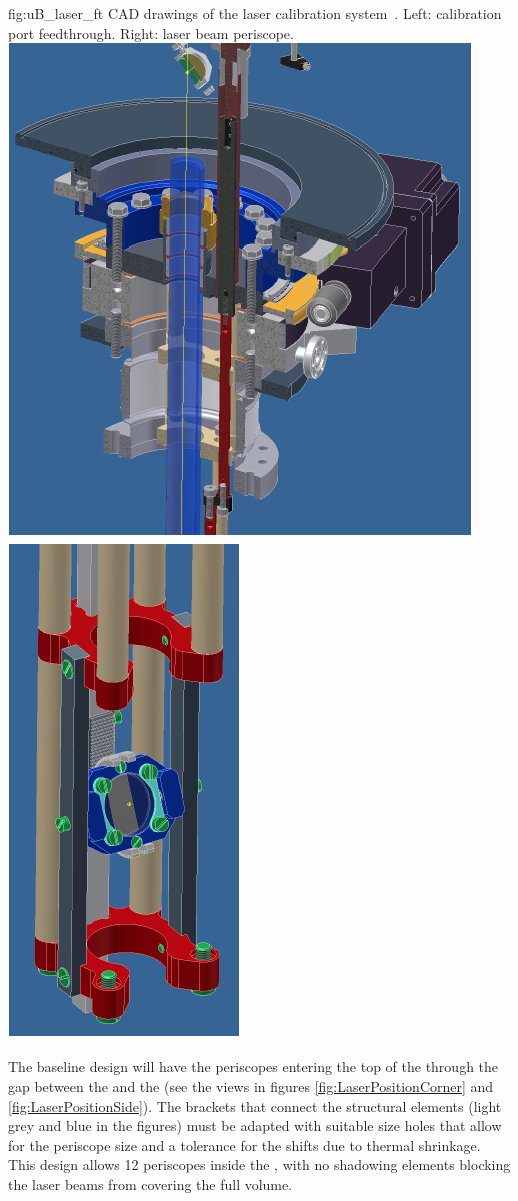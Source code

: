 \begin{dunefigure}{fig:uB_laser_ft}
{CAD drawings of the  laser calibration system~\cite{microboone}. Left: calibration port feedthrough. Right: laser beam periscope. %
}
\includegraphics[width=0.49\linewidth]{graphics/uB_laser_ft}
\includegraphics[width=0.248\linewidth]{graphics/uB_laser_periscope}
\end{dunefigure}

The baseline design will have the periscopes entering the top of the  through the gap %
between the  and the  (see the views in figures \ref{fig:LaserPositionCorner} and \ref{fig:LaserPositionSide}). The brackets that connect the  structural elements (light grey and blue in the figures) must be adapted with suitable size holes that allow for the periscope size and a tolerance for the shifts due to  thermal shrinkage. This design allows \num{12} periscopes inside the , with no shadowing elements blocking the laser beams from covering the full volume.

